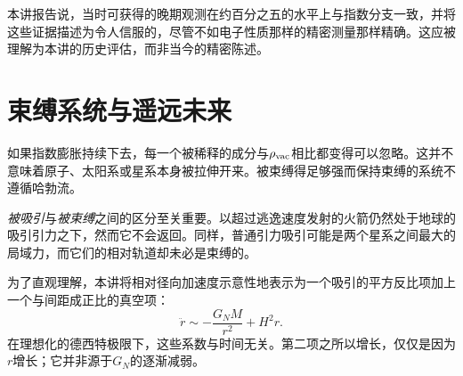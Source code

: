 本讲报告说，当时可获得的晚期观测在约百分之五的水平上与指数分支一致，并将这些证据描述为令人信服的，尽管不如电子性质那样的精密测量那样精确。这应被理解为本讲的历史评估，而非当今的精密陈述。

\begin{classroomqa}
\end{classroomqa}

\section{束缚系统与遥远未来}

如果指数膨胀持续下去，每一个被稀释的成分与\(\rho_{\rm vac}\)相比都变得可以忽略。这并不意味着原子、太阳系或星系本身被拉伸开来。被束缚得足够强而保持束缚的系统不遵循哈勃流。

\begin{classroomqa}
\end{classroomqa}

\emph{被吸引}与\emph{被束缚}之间的区分至关重要。以超过逃逸速度发射的火箭仍然处于地球的吸引引力之下，然而它不会返回。同样，普通引力吸引可能是两个星系之间最大的局域力，而它们的相对轨道却未必是束缚的。

\begin{classroomqa}
\end{classroomqa}

为了直观理解，本讲将相对径向加速度示意性地表示为一个吸引的平方反比项加上一个与间距成正比的真空项：
\enlargethispage{2pt}
\begin{equation}
\ddot r\sim-\frac{G_NM}{r^2}+H^2r.
\label{eq:l08-newtonian-vacuum}
\end{equation}
在理想化的德西特极限下，这些系数与时间无关。第二项之所以增长，仅仅是因为\(r\)增长；它并非源于\(G_N\)的逐渐减弱。

